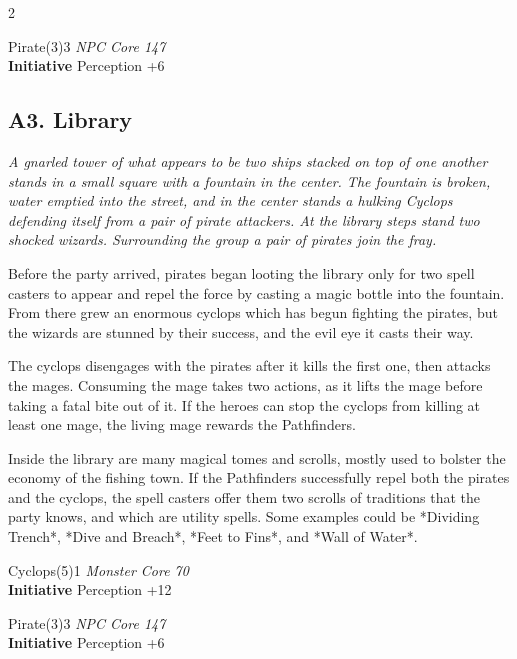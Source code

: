 \begin{multicols}{2}
  \begin{creaturebox}{Pirate(3)}{3}
    \textit{NPC Core 147}\\
    \textbf{Initiative} Perception +6
  \end{creaturebox}

\subsection{A3. Library}

\begin{pf-parchment}[\textcolor{title1}{Description}]
  \textcolor{title1}{\textit{A gnarled tower of what appears to be two ships stacked on top of one another stands in a small square with a fountain in the center. The fountain is broken, water emptied into the street, and in the center stands a hulking Cyclops defending itself from a pair of pirate attackers. At the library steps stand two shocked wizards. Surrounding the group a pair of pirates join the fray.}}
\end{pf-parchment}

Before the party arrived, pirates began looting the library only for two spell casters to appear and repel the force by casting a magic bottle into the fountain. From there grew an enormous cyclops which has begun fighting the pirates, but the wizards are stunned by their success, and the evil eye it casts their way.

The cyclops disengages with the pirates after it kills the first one, then attacks the mages. Consuming the mage takes two actions, as it lifts the mage before taking a fatal bite out of it. If the heroes can stop the cyclops from killing at least one mage, the living mage rewards the Pathfinders.

Inside the library are many magical tomes and scrolls, mostly used to bolster the economy of the fishing town. If the Pathfinders successfully repel both the pirates and the cyclops, the spell casters offer them two scrolls of traditions that the party knows, and which are utility spells. Some examples could be *Dividing Trench*, *Dive and Breach*, *Feet to Fins*, and *Wall of Water*.

  \begin{creaturebox}{Cyclops(5)}{1}
    \textit{Monster Core 70}\\
    \textbf{Initiative} Perception +12
  \end{creaturebox}

  \begin{creaturebox}{Pirate(3)}{3}
    \textit{NPC Core 147}\\
    \textbf{Initiative} Perception +6
  \end{creaturebox}


\end{multicols}
